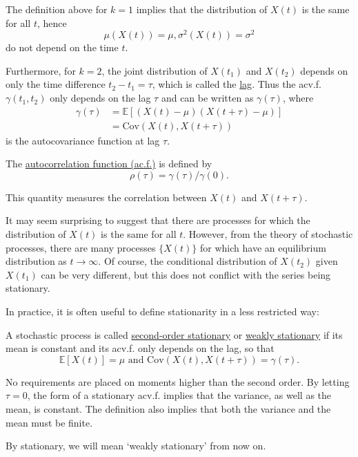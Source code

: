 The definition above for $k = 1$ implies that the distribution of $X(t)$ is the same for all $t$, hence 
\[ \mu(X(t)) = \mu, \sigma^2(X(t)) = \sigma^2 \]
do not depend on the time $t$.

Furthermore, for $k = 2$, the joint distribution of $X(t_1)$ and $X(t_2)$ depends on only the time difference $t_2 - t_1 = \tau$, which is called the \underline{lag}. Thus the acv.f. $\gamma(t_1, t_2)$ only depends on the lag $\tau$ and can be written as $\gamma(\tau)$, where
\begin{align*}
	\gamma(\tau) 
	&= \mathbb{E}\left[ (X(t) - \mu)(X(t+\tau) - \mu) \right] \\
	&= \mathrm{Cov}(X(t), X(t+\tau))
\end{align*}
is the autocovariance function at lag $\tau$.

\begin{definition*}[]
The \underline{autocorrelation function (ac.f.)} is defined by 
\[ \rho(\tau) = \gamma(\tau) / \gamma(0). \]
\end{definition*}
This quantity measures the correlation between $X(t)$ and $X(t+\tau)$.

It may seem surprising to suggest that there are processes for which the distribution of $X(t)$ is the same for 
all $t$. However, from the theory of stochastic processes, there are many processes $\{ X(t) \}$ for which have 
an equilibrium distribution as $t \to \infty$. Of course, the conditional distribution of $X(t_2)$ given $X(t_1)$ 
can be very different, but this does not conflict with the series being stationary.

In practice, it is often useful to define stationarity in a less restricted way:
\begin{definition*}[]
A stochastic process is called \underline{second-order stationary} or \underline{weakly stationary} if its mean 
is constant and its acv.f. only depends on the lag, so that 
\[ \mathbb{E}\left[ X(t) \right] = \mu \text{ and } \mathrm{Cov}(X(t), X(t + \tau)) = \gamma(\tau). \]
\end{definition*}
No requirements are placed on moments higher than the second order. By letting $\tau = 0$, the form of a 
stationary acv.f. implies that the variance, as well as the mean, is constant. The definition also implies that 
both the variance and the mean must be finite.

By stationary, we will mean `weakly stationary' from now on.



